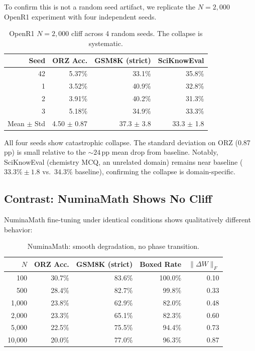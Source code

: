 \documentclass{article}
\begin{document}
To confirm this is not a random seed artifact, we replicate the $N{=}2{,}000$ OpenR1 experiment with four independent seeds.

\begin{table}[h]
\centering
\caption{OpenR1 $N{=}2{,}000$ cliff across 4 random seeds. The collapse is systematic.}
\label{tab:seeds}
\small
\begin{tabular}{@{}rrrr@{}}
\toprule
Seed & ORZ Acc. & GSM8K (strict) & SciKnowEval \\
\midrule
42 & 5.37\% & 33.1\% & 35.8\% \\
1 & 3.52\% & 40.9\% & 32.8\% \\
2 & 3.91\% & 40.2\% & 31.3\% \\
3 & 5.18\% & 34.9\% & 33.3\% \\
\midrule
Mean $\pm$ Std & 4.50 $\pm$ 0.87 & 37.3 $\pm$ 3.8 & 33.3 $\pm$ 1.8 \\
\bottomrule
\end{tabular}
\end{table}

All four seeds show catastrophic collapse. The standard deviation on ORZ (0.87\,pp) is small relative to the ${\sim}24$\,pp mean drop from baseline. Notably, SciKnowEval (chemistry MCQ, an unrelated domain) remains near baseline ($33.3\% \pm 1.8$ vs.\ 34.3\% baseline), confirming the collapse is domain-specific.

\subsection{Contrast: NuminaMath Shows No Cliff}

NuminaMath fine-tuning under identical conditions shows qualitatively different behavior:

\begin{table}[h]
\centering
\caption{NuminaMath: smooth degradation, no phase transition.}
\label{tab:numinamath}
\small
\begin{tabular}{@{}rrrrr@{}}
\toprule
$N$ & ORZ Acc. & GSM8K (strict) & Boxed Rate & $\|\Delta W\|_F$ \\
\midrule
100 & 30.7\% & 83.6\% & 100.0\% & 0.10 \\
500 & 28.4\% & 82.7\% & 99.8\% & 0.33 \\
1,000 & 23.8\% & 62.9\% & 82.0\% & 0.48 \\
2,000 & 23.3\% & 65.1\% & 82.3\% & 0.60 \\
5,000 & 22.5\% & 75.5\% & 94.4\% & 0.73 \\
10,000 & 20.0\% & 77.0\% & 96.3\% & 0.87 \\
\bottomrule
\end{tabular}
\end{table}
\end{document}
